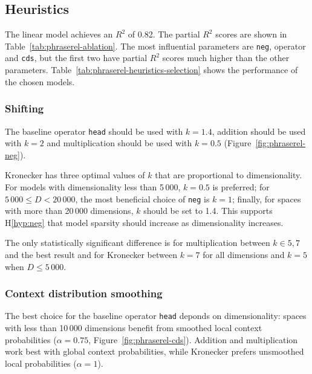 \subsection{Heuristics}
\label{sec:heuristics-phraserel}



The linear model achieves an $R^2$ of 0.82. The partial $R^2$ scores are shown in Table~\ref{tab:phraserel-ablation}. The most influential parameters are \texttt{neg}, operator and \texttt{cds}, but the first two have partial $R^2$ scores much higher than the other parameters. Table~\ref{tab:phraserel-heuristics-selection} shows the performance of the chosen models.

\subsubsection{Shifting}
\label{sec:shifting-phraserel}

The baseline operator \texttt{head} should be used with $k = 1.4$, addition should be used with $k = 2$ and multiplication should be used with $k = 0.5$ (Figure~\ref{fig:phraserel-neg}).

Kronecker has three optimal values of $k$ that are proportional to dimensionality. For models with dimensionality less than 5\,000, $k = 0.5$ is preferred; for $5\,000 \leq D < 20\,000$, the most beneficial choice of \texttt{neg} is $k = 1$; finally, for spaces with more than 20\,000 dimensions, $k$ should be set to 1.4. This supports H\ref{hyp:neg} that model sparsity should increase as dimensionality increases.

The only statistically significant difference is for multiplication between $k \in {5, 7}$ and the best result and for Kronecker between $k = 7$ for all dimensions and $k = 5$ when $D \le 5\,000$.



\subsubsection{Context distribution smoothing}
\label{sec:cont-distr-smooth-phraserel}

The best choice for the baseline operator \texttt{head} deponds on dimensionality: spaces with less than 10\,000 dimensions benefit from smoothed local context probabilities ($\alpha = 0.75$, Figure~\ref{fig:phraserel-cds}). Addition and multiplication work best with global context probabilities, while Kronecker prefers unsmoothed local probabilities ($\alpha = 1$).

